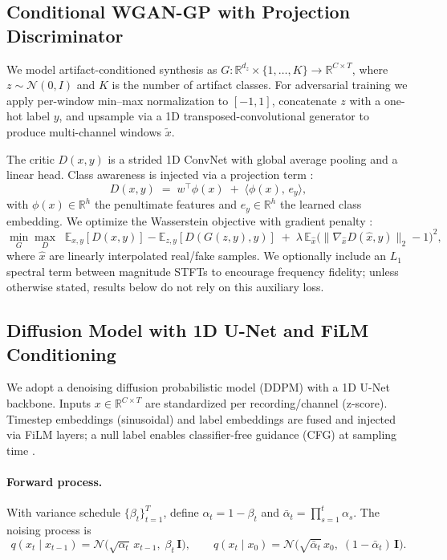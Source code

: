\documentclass{article}
\begin{document}
\subsection{Conditional WGAN-GP with Projection Discriminator}
We model artifact-conditioned synthesis as $G:\mathbb{R}^{d_z}\times\{1,\dots,K\}\!\to\!\mathbb{R}^{C\times T}$, where $z\!\sim\!\mathcal{N}(0,I)$ and $K$ is the number of artifact classes. For adversarial training we apply per-window min--max normalization to $[-1,1]$, concatenate $z$ with a one-hot label $y$, and upsample via a 1D transposed-convolutional generator to produce multi-channel windows $\tilde{x}$. 

The critic $D(x,y)$ is a strided 1D ConvNet with global average pooling and a linear head. Class awareness is injected via a projection term \citep{miyato2018cgan}:
\[
D(x,y)\;=\;w^\top \phi(x)\;+\;\langle \phi(x),\, e_y\rangle,
\]
with $\phi(x)\in\mathbb{R}^h$ the penultimate features and $e_y\in\mathbb{R}^h$ the learned class embedding. We optimize the Wasserstein objective with gradient penalty \citep{gulrajani2017wgan}:
\[
\min_{G}\max_{D}\;\;\mathbb{E}_{x,y}[D(x,y)]-\mathbb{E}_{z,y}[D(G(z,y),y)]
\;+\;\lambda\,\mathbb{E}_{\hat x}\big(\lVert\nabla_{\hat x}D(\hat x,y)\rVert_2-1\big)^2,
\]
where $\hat x$ are linearly interpolated real/fake samples. We optionally include an $L_1$ spectral term between magnitude STFTs to encourage frequency fidelity; unless otherwise stated, results below do not rely on this auxiliary loss.

\subsection{Diffusion Model with 1D U\texorpdfstring{\!-}{-}Net and FiLM Conditioning}
We adopt a denoising diffusion probabilistic model (DDPM) \citep{ho2020denoisingprobabilistic} with a 1D U\!-Net backbone. Inputs $x\in\mathbb{R}^{C\times T}$ are standardized per recording/channel (z-score). Timestep embeddings (sinusoidal) and label embeddings are fused and injected via FiLM layers; a null label enables classifier-free guidance (CFG) at sampling time \citep{ho2022classifierfree}.

\paragraph{Forward process.} With variance schedule $\{\beta_t\}_{t=1}^T$, define $\alpha_t=1-\beta_t$ and $\bar\alpha_t=\prod_{s=1}^t \alpha_s$. The noising process is
\[
q(x_t\mid x_{t-1})=\mathcal{N}\big(\sqrt{\alpha_t}\,x_{t-1},\; \beta_t\,\mathbf{I}\big),\qquad
q(x_t\mid x_0)=\mathcal{N}\big(\sqrt{\bar\alpha_t}\,x_0,\; (1-\bar\alpha_t)\,\mathbf{I}\big).
\]
\end{document}
